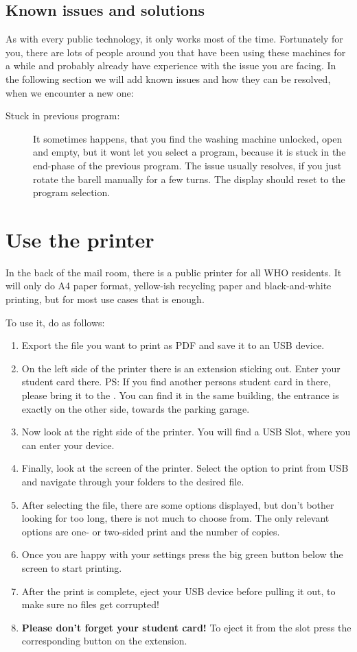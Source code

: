 \subsection{Known issues and solutions}
As with every public technology, it only works most of the time. Fortunately for you, there are lots of people around you that have been using these machines for a while and probably already have experience with the issue you are facing. In the following section we will add known issues and how they can be resolved, when we encounter a new one:
\begin{description}
    \item[Stuck in previous program:] It sometimes happens, that you find the washing machine unlocked, open and empty, but it wont let you select a program, because it is stuck in the end-phase of the previous program. The issue usually resolves, if you just rotate the barell manually for a few turns. The display should reset to the program selection.
\end{description}

\section{Use the printer}
In the back of the mail room, there is a public printer for all WHO residents. It will only do A4 paper format, yellow-ish recycling paper and black-and-white printing, but for most use cases that is enough.

To use it, do as follows:
\begin{enumerate}
    \item Export the file you want to print as PDF and save it to an USB device.
    \item On the left side of the printer there is an extension sticking out. Enter your student card there. PS: If you find another persons student card in there, please bring it to the . You can find it in the same building, the entrance is exactly on the other side, towards the parking garage.
    \item Now look at the right side of the printer. You will find a USB Slot, where you can enter your device.
    \item Finally, look at the screen of the printer. Select the option to print from USB and navigate through your folders to the desired file.
    \item After selecting the file, there are some options displayed, but don't bother looking for too long, there is not much to choose from. The only relevant options are one- or two-sided print and the number of copies.
    \item Once you are happy with your settings press the big green button below the screen to start printing.
    \item After the print is complete, eject your USB device before pulling it out, to make sure no files get corrupted!
    \item \textbf{Please don't forget your student card!} To eject it from the slot press the corresponding button on the extension.
\end{enumerate}

